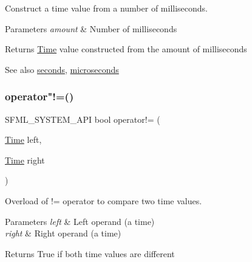 Construct a time value from a number of milliseconds. 


\begin{DoxyParams}{Parameters}
{\em amount} & Number of milliseconds\\
\hline
\end{DoxyParams}
\begin{DoxyReturn}{Returns}
\mbox{\hyperlink{classsf_1_1_time}{Time}} value constructed from the amount of milliseconds
\end{DoxyReturn}
\begin{DoxySeeAlso}{See also}
\mbox{\hyperlink{classsf_1_1_time_ae36b9ef700f0ed0516abf0194ceb546b}{seconds}}, \mbox{\hyperlink{classsf_1_1_time_a951fd7219641f1e8191887f5dfe0dc31}{microseconds}} \begin{DoxyVerb}\end{DoxyVerb}
 
\end{DoxySeeAlso}
\mbox{\label{classsf_1_1_time_ae06b561f6422ec8ca414d400efd2cf4b}} 
\subsubsection{\texorpdfstring{operator"!=()}{operator!=()}}
{\footnotesize\ttfamily S\+F\+M\+L\+\_\+\+S\+Y\+S\+T\+E\+M\+\_\+\+A\+PI bool operator!= (\begin{DoxyParamCaption}\item[{\mbox{\hyperlink{classsf_1_1_time}{Time}}}]{left,  }\item[{\mbox{\hyperlink{classsf_1_1_time}{Time}}}]{right }\end{DoxyParamCaption})\hspace{0.3cm}{\ttfamily [related]}}



Overload of != operator to compare two time values. 


\begin{DoxyParams}{Parameters}
{\em left} & Left operand (a time) \\
\hline
{\em right} & Right operand (a time)\\
\hline
\end{DoxyParams}
\begin{DoxyReturn}{Returns}
True if both time values are different \begin{DoxyVerb}\end{DoxyVerb}
 
\end{DoxyReturn}
\mbox{\label{classsf_1_1_time_aafb8b12fb0ac0e366d6ea9c9e9f93335}} 
